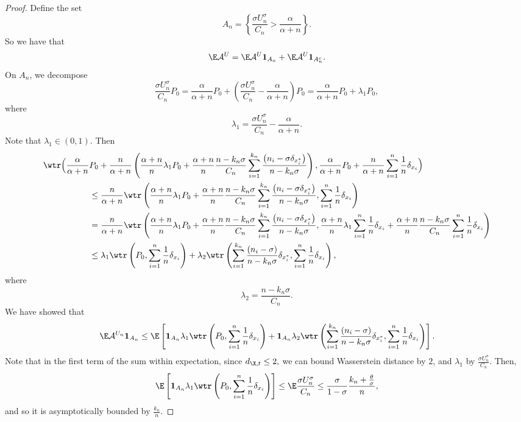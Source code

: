 \begin{proof}
    Define the set 
    \[
    A_n = \left\{ \frac{ \sigma U_n^\sigma}{C_n} > \frac{\alpha}{\alpha + n}\right\}.
    \]
    So we have that 
    \[
    \E \mathcal{A}^U = \E \mathcal{A}^U\mathbf{1}_{A_n} + \E \mathcal{A}^U\mathbf{1}_{A^c_n}.
    \]
    On $A_n$, we decompose
    \[
    \frac{ \sigma U_n^\sigma}{C_n} P_0 = \frac{\alpha}{\alpha + n}P_0 + \left( \frac{ \sigma U_n^\sigma}{C_n} - \frac{\alpha}{\alpha + n} \right) P_0 = \frac{\alpha}{\alpha + n}P_0 + \lambda_1 P_0,
    \]
    where
    \[
    \lambda_1 = \frac{ \sigma U_n^\sigma}{C_n} - \frac{\alpha}{\alpha + n}.
    \]    
    Note that $\lambda_1 \in (0,1)$. Then
    \begin{align*}
        \wtr \Big(\frac{\alpha}{\alpha + n}&P_0 +  \frac{n}{\alpha + n} \left( \frac{\alpha + n}{n}\lambda_1 P_0 + \frac{\alpha + n}{n}\frac{n-k_n\sigma}{C_n}\sum_{i = 1}^{k_n}\frac{\left(n_i - \sigma\delta_{x_i^*}\right)}{n-k_n\sigma} \right),
       \frac{\alpha}{\alpha + n}P_0 + \frac{n}{\alpha + n}\sum_{i = 1}^n\frac{1}{n}\delta_{x_i}\Big) \\
        & \leq \frac{n}{\alpha + n}\wtr \left( \frac{\alpha + n}{n}\lambda_1 P_0 + \frac{\alpha + n}{n}\frac{n-k_n\sigma}{C_n}\sum_{i = 1}^{k_n}\frac{\left(n_i - \sigma \delta_{x_i^*}\right)}{n-k_n\sigma}, \sum_{i = 1}^n \frac{1}{n}\delta_{x_i}\right) \\ 
        & = \frac{n}{\alpha + n}\wtr \left( \frac{\alpha + n}{n}\lambda_1 P_0 + \frac{\alpha + n}{n}\frac{n-k_n\sigma}{C_n}\sum_{i = 1}^{k_n}\frac{\left(n_i - \sigma \delta_{x_i^*}\right)}{n-k_n\sigma}, \frac{\alpha + n}{n}\lambda_1\sum_{i = 1}^n\frac{1}{n}\delta_{x_i}  + \frac{\alpha + n}{n}\frac{n-k_n\sigma}{C_n}\sum_{i = 1}^n\frac{1}{n}\delta_{x_i}\right) \\
        & \leq \lambda_1 \wtr\left(P_0, \sum_{i = 1}^n \frac{1}{n}\delta_{x_i}\right) + \lambda_2\wtr \left( \sum_{i = 1}^{k_n} \frac{(n_i-\sigma)}{n-k_n\sigma}\delta_{x_i^*},\sum_{i = 1}^n\frac{1}{n}\delta_{x_i}\right),
    \end{align*}
    where 
    \[
    \lambda_2 = \frac{n - k_n \sigma}{C_n}.
    \]
    We have showed that
    \[
    \E \mathcal{A}^{U_n}\mathbf{1}_{A_n} \leq \E \left[ \mathbf{1}_{A_n}\lambda_1 \wtr\left(P_0, \sum_{i = 1}^n \frac{1}{n}\delta_{x_i}\right) +  \mathbf{1}_{A_n}\lambda_2\wtr \left( \sum_{i = 1}^{k_n} \frac{(n_i-\sigma)}{n-k_n\sigma}\delta_{x_i^*},\sum_{i = 1}^n\frac{1}{n}\delta_{x_i}\right) \right].
    \]
    Note that in the first term of the sum within expectation, since $d_{\X,t} \leq 2,$ we can bound Wasserstein distance by $2$, and $\lambda_1$ by $\frac{ \sigma U_n^\sigma}{C_n}$. Then,
    \[
    \E \left[ \mathbf{1}_{A_n}\lambda_1 \wtr\left(P_0, \sum_{i = 1}^n \frac{1}{n}\delta_{x_i}\right)\right]\leq \E \frac{ \sigma U_n^\sigma}{C_n} \leq \frac{\sigma}{1-\sigma}\frac{k_n + \frac{\theta}{\sigma}}{n},
    \]
    and so it is asymptotically bounded by $\frac{k_n}{n}$.
    

\end{proof}
